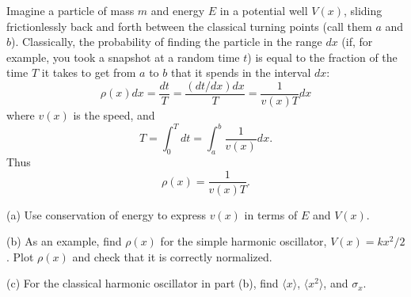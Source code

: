 \documentclass{article}
\begin{document}
\begin{ques}\label{q6}
Imagine a particle of mass $m$ and energy $E$ in a potential well $V (x)$, sliding frictionlessly
back and forth between the classical turning points (call them $a$ and $b$). Classically, the
probability of finding the particle in the range $dx$ (if, for example, you took a snapshot at
a random time $t$) is equal to the fraction of the time $T$ it takes to get from $a$ to $b$ that it
spends in the interval $dx$:
\[
\rho(x)dx = \frac{dt}{T} = \frac{(dt/dx)dx}{T} = \frac{1}{v(x)T} dx
\]
where $v(x)$ is the speed, and
\[
T = \int_0^T dt = \int_a^b \frac{1}{v(x)} dx .
\]
Thus
\[
\rho(x) = \frac{1}{v(x)T}.
\]

(a) Use conservation of energy to express $v(x)$ in terms of $E$ and $V(x)$.

(b) As an example, find $\rho(x)$ for the simple harmonic oscillator, $V(x) = kx^2/2$. Plot $\rho(x)$
and check that it is correctly normalized.

(c) For the classical harmonic oscillator in part (b), find $\langle x\rangle$, $\langle x^2\rangle$, and $\sigma_x$.
\end{ques}
\end{document}
